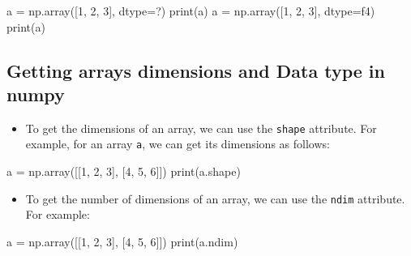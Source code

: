 \documentclass[11pt]{article}
\providecommand{\tightlist}{%
      \setlength{\itemsep}{0pt}\setlength{\parskip}{0pt}}
\newenvironment{Shaded}{}{}
\newcommand{\DecValTok}[1]{\textcolor[rgb]{0.25,0.63,0.44}{{#1}}}
\newcommand{\NormalTok}[1]{{#1}}
\newcommand{\OperatorTok}[1]{\textcolor[rgb]{0.40,0.40,0.40}{{#1}}}
\newcommand{\BuiltInTok}[1]{{#1}}
\begin{document}
\begin{Shaded}
\begin{Highlighting}[]
\NormalTok{a }\OperatorTok{=}\NormalTok{ np.array([}\DecValTok{1}\NormalTok{, }\DecValTok{2}\NormalTok{, }\DecValTok{3}\NormalTok{], dtype}\OperatorTok{=}\NormalTok{?)}
\BuiltInTok{print}\NormalTok{(a)}
\NormalTok{a }\OperatorTok{=}\NormalTok{ np.array([}\DecValTok{1}\NormalTok{, }\DecValTok{2}\NormalTok{, }\DecValTok{3}\NormalTok{], dtype}\OperatorTok{=}\NormalTok{f4)}
\BuiltInTok{print}\NormalTok{(a)}
\end{Highlighting}
\end{Shaded}

\hypertarget{getting-arrays-dimensions-and-data-type-in-numpy}{%
\subsection{Getting arrays dimensions and Data type in
numpy}\label{getting-arrays-dimensions-and-data-type-in-numpy}}

\begin{itemize}
\tightlist
\item
  To get the dimensions of an array, we can use the \texttt{shape}
  attribute. For example, for an array \texttt{a}, we can get its
  dimensions as follows:
\end{itemize}

\begin{Shaded}
\begin{Highlighting}[]
\NormalTok{a }\OperatorTok{=}\NormalTok{ np.array([[}\DecValTok{1}\NormalTok{, }\DecValTok{2}\NormalTok{, }\DecValTok{3}\NormalTok{], [}\DecValTok{4}\NormalTok{, }\DecValTok{5}\NormalTok{, }\DecValTok{6}\NormalTok{]])}
\BuiltInTok{print}\NormalTok{(a.shape)}
\end{Highlighting}
\end{Shaded}

\begin{itemize}
\tightlist
\item
  To get the number of dimensions of an array, we can use the
  \texttt{ndim} attribute. For example:
\end{itemize}

\begin{Shaded}
\begin{Highlighting}[]
\NormalTok{a }\OperatorTok{=}\NormalTok{ np.array([[}\DecValTok{1}\NormalTok{, }\DecValTok{2}\NormalTok{, }\DecValTok{3}\NormalTok{], [}\DecValTok{4}\NormalTok{, }\DecValTok{5}\NormalTok{, }\DecValTok{6}\NormalTok{]])}
\BuiltInTok{print}\NormalTok{(a.ndim)}
\end{Highlighting}
\end{Shaded}
\end{document}
